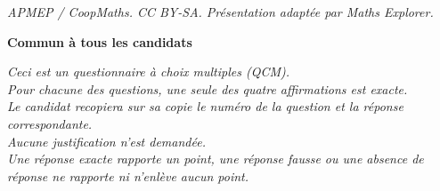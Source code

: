 \documentclass[10pt]{article}
\begin{document}
\noindent\textit{APMEP / CoopMaths. CC BY-SA. Présentation adaptée par Maths Explorer.}\par\medskip
\textbf{Commun à tous les candidats}

\medskip

\emph{Ceci est un questionnaire à choix multiples (QCM).\\
 Pour chacune des questions, une seule des quatre affirmations est exacte.\\
  Le candidat recopiera sur sa copie le numéro de la question et la réponse correspondante.\\
Aucune justification n'est demandée.\\
Une réponse exacte rapporte un point, une réponse fausse ou une absence de réponse ne rapporte ni n'enlève aucun point.}

\medskip
\end{document}
